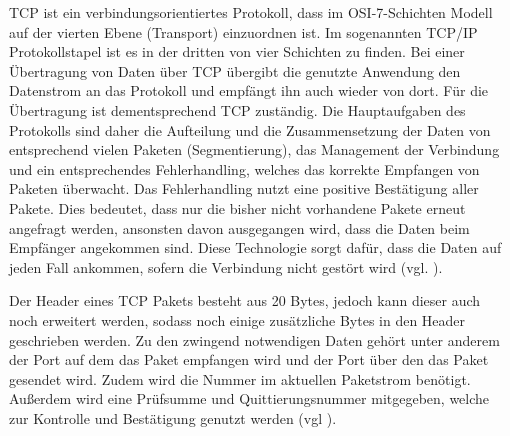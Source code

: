 \ac{TCP} ist ein verbindungsorientiertes Protokoll, dass im \ac{OSI}-7-Schichten Modell auf der vierten Ebene (Transport) einzuordnen ist. Im sogenannten \ac{TCP}/\ac{IP} Protokollstapel ist es in der dritten von vier Schichten zu finden. Bei einer Übertragung von Daten über \ac{TCP} übergibt die genutzte Anwendung den Datenstrom an das Protokoll und empfängt ihn auch wieder von dort. Für die Übertragung ist dementsprechend \ac{TCP} zuständig. 
Die Hauptaufgaben des Protokolls sind daher die Aufteilung und die Zusammensetzung der Daten von entsprechend vielen Paketen (Segmentierung), das Management der Verbindung und ein entsprechendes Fehlerhandling, welches das korrekte Empfangen von Paketen überwacht. Das Fehlerhandling nutzt eine positive Bestätigung aller Pakete. Dies bedeutet, dass nur die bisher nicht vorhandene Pakete erneut angefragt werden, ansonsten davon ausgegangen wird, dass die Daten beim Empfänger angekommen sind. Diese Technologie sorgt dafür, dass die Daten auf jeden Fall ankommen, sofern die Verbindung nicht gestört wird (vgl. \cite{.c}\cite{.22.11.2016}).

Der Header eines \ac{TCP} Pakets besteht aus 20 Bytes, jedoch kann dieser auch noch erweitert werden, sodass noch einige zusätzliche Bytes in den Header geschrieben werden. Zu den zwingend notwendigen Daten gehört unter anderem der Port auf dem das Paket empfangen wird und der Port über den das Paket gesendet wird. Zudem wird die Nummer im aktuellen Paketstrom benötigt. Außerdem wird eine Prüfsumme und Quittierungsnummer mitgegeben, welche zur Kontrolle und Bestätigung genutzt werden (vgl \cite{.c}).
